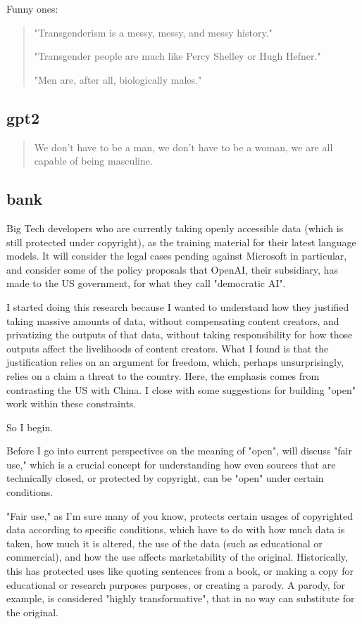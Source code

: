 \documentclass[11pt]{article}
\begin{document}
Funny ones:

\begin{quote}
"Transgenderism is a messy, messy, and messy history."

"Transgender people are much like Percy Shelley or Hugh Hefner."

"Men are, after all, biologically males."
\end{quote}
\subsection{gpt2}
\label{sec:org8df5c1a}
\begin{quote}
We don't have to be a man, we don't have to be a woman, we are all
capable of being masculine.
\end{quote}

\subsection{bank}
\label{sec:org9318431}

Big Tech developers who are currently taking openly accessible data
(which is still protected under copyright), as the training material
for their latest language models. It will consider the legal cases
pending against Microsoft in particular, and consider some of the
policy proposals that OpenAI, their subsidiary, has made to the US
government, for what they call "democratic AI".

I started doing this research because I wanted to understand how they
justified taking massive amounts of data, without compensating content
creators, and privatizing the outputs of that data, without taking
responsibility for how those outputs affect the livelihoods of content
creators. What I found is that the justification relies on an argument
for freedom, which, perhaps unsurprisingly, relies on a claim a threat
to the country. Here, the emphasis comes from contrasting the US with
China. I close with some suggestions for building "open" work within
these constraints.

So I begin.


Before I go into current perspectives on the meaning of "open", will
discuss "fair use," which is a crucial concept for understanding how
even sources that are technically closed, or protected by copyright,
can be "open" under certain conditions.

"Fair use," as I'm sure many of you know, protects certain usages of
copyrighted data according to specific conditions, which have to do
with how much data is taken, how much it is altered, the use of the
data (such as educational or commercial), and how the use affects
marketability of the original. Historically, this has protected uses
like quoting sentences from a book, or making a copy for educational
or research purposes purposes, or creating a parody. A parody, for
example, is considered "highly transformative", that in no way can
substitute for the original.
\end{document}
